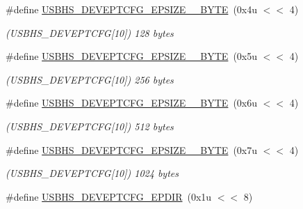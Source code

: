 \begin{DoxyCompactItemize}
\#define \mbox{\hyperlink{group__SAMV71__USBHS_gaada6b4c339fd81152ebf6b88657ce678}{U\+S\+B\+H\+S\+\_\+\+D\+E\+V\+E\+P\+T\+C\+F\+G\+\_\+\+E\+P\+S\+I\+Z\+E\+\_\+\_\+\+B\+Y\+TE}}~(0x4u $<$$<$ 4)
\begin{DoxyCompactList}\small\item\em (U\+S\+B\+H\+S\+\_\+\+D\+E\+V\+E\+P\+T\+C\+FG\mbox{[}10\mbox{]}) 128 bytes \end{DoxyCompactList}\item 
\mbox{\label{group__SAMV71__USBHS_ga65463bfd966add42c50286017402b044}} 
\#define \mbox{\hyperlink{group__SAMV71__USBHS_ga65463bfd966add42c50286017402b044}{U\+S\+B\+H\+S\+\_\+\+D\+E\+V\+E\+P\+T\+C\+F\+G\+\_\+\+E\+P\+S\+I\+Z\+E\+\_\+\_\+\+B\+Y\+TE}}~(0x5u $<$$<$ 4)
\begin{DoxyCompactList}\small\item\em (U\+S\+B\+H\+S\+\_\+\+D\+E\+V\+E\+P\+T\+C\+FG\mbox{[}10\mbox{]}) 256 bytes \end{DoxyCompactList}\item 
\mbox{\label{group__SAMV71__USBHS_ga2d333b468cf7268f13cf096b3fab2467}} 
\#define \mbox{\hyperlink{group__SAMV71__USBHS_ga2d333b468cf7268f13cf096b3fab2467}{U\+S\+B\+H\+S\+\_\+\+D\+E\+V\+E\+P\+T\+C\+F\+G\+\_\+\+E\+P\+S\+I\+Z\+E\+\_\+\_\+\+B\+Y\+TE}}~(0x6u $<$$<$ 4)
\begin{DoxyCompactList}\small\item\em (U\+S\+B\+H\+S\+\_\+\+D\+E\+V\+E\+P\+T\+C\+FG\mbox{[}10\mbox{]}) 512 bytes \end{DoxyCompactList}\item 
\mbox{\label{group__SAMV71__USBHS_ga22733ae82f074ec9b79dc1d573ada90d}} 
\#define \mbox{\hyperlink{group__SAMV71__USBHS_ga22733ae82f074ec9b79dc1d573ada90d}{U\+S\+B\+H\+S\+\_\+\+D\+E\+V\+E\+P\+T\+C\+F\+G\+\_\+\+E\+P\+S\+I\+Z\+E\+\_\+\_\+\+B\+Y\+TE}}~(0x7u $<$$<$ 4)
\begin{DoxyCompactList}\small\item\em (U\+S\+B\+H\+S\+\_\+\+D\+E\+V\+E\+P\+T\+C\+FG\mbox{[}10\mbox{]}) 1024 bytes \end{DoxyCompactList}\item 
\mbox{\label{group__SAMV71__USBHS_ga0ecea3cab7098eb72284e7764de66b99}} 
\#define \mbox{\hyperlink{group__SAMV71__USBHS_ga0ecea3cab7098eb72284e7764de66b99}{U\+S\+B\+H\+S\+\_\+\+D\+E\+V\+E\+P\+T\+C\+F\+G\+\_\+\+E\+P\+D\+IR}}~(0x1u $<$$<$ 8)
$$
\end{DoxyCompactItemize}
